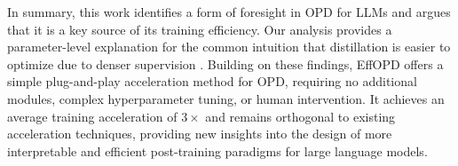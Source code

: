 \documentclass{llmxive}
\begin{document}
In summary, this work identifies a form of foresight in OPD for LLMs and argues that it is a key source of its training efficiency. Our analysis provides a parameter-level explanation for the common intuition that distillation is easier to optimize due to denser supervision \citep{Yang2026LearningBT}. Building on these findings, EffOPD offers a simple plug-and-play acceleration method for OPD, requiring no additional modules, complex hyperparameter tuning, or human intervention. It achieves an average training acceleration of $3\times$ and remains orthogonal to existing acceleration techniques, providing new insights into the design of more interpretable and efficient post-training paradigms for large language models.




\end{document}
